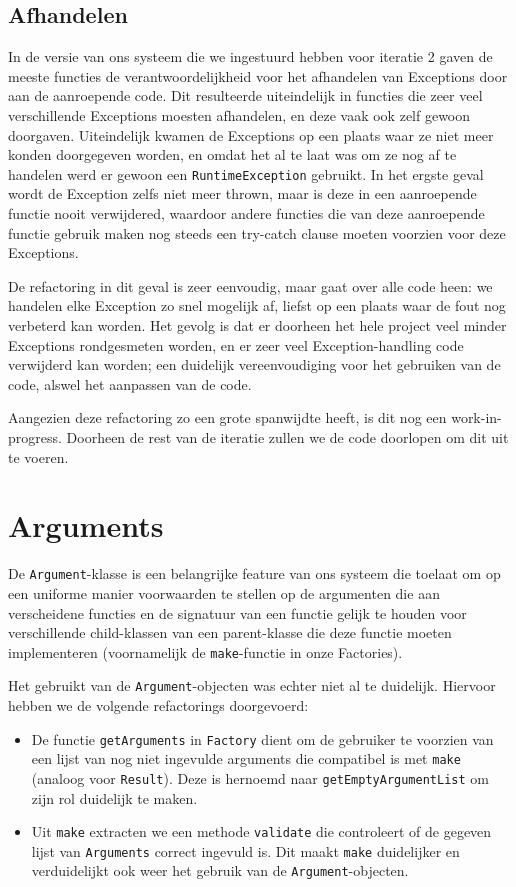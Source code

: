 \documentclass[a4paper]{article}
\begin{document}
\subsection{Afhandelen}
In de versie van ons systeem die we ingestuurd hebben voor iteratie 2 gaven de meeste functies de verantwoordelijkheid voor het afhandelen van Exceptions door aan de aanroepende code. Dit resulteerde uiteindelijk in functies die zeer veel verschillende Exceptions moesten afhandelen, en deze vaak ook zelf gewoon doorgaven. Uiteindelijk kwamen de Exceptions op een plaats waar ze niet meer konden doorgegeven worden, en omdat het al te laat was om ze nog af te handelen werd er gewoon een \texttt{RuntimeException} gebruikt. In het ergste geval wordt de Exception zelfs niet meer thrown, maar is deze in een aanroepende functie nooit verwijdered, waardoor andere functies die van deze aanroepende functie gebruik maken nog steeds een try-catch clause moeten voorzien voor deze Exceptions.

De refactoring in dit geval is zeer eenvoudig, maar gaat over alle code heen: we handelen elke Exception zo snel mogelijk af, liefst op een plaats waar de fout nog verbeterd kan worden. Het gevolg is dat er doorheen het hele project veel minder Exceptions rondgesmeten worden, en er zeer veel Exception-handling code verwijderd kan worden; een duidelijk vereenvoudiging voor het gebruiken van de code, alswel het aanpassen van de code.

Aangezien deze refactoring zo een grote spanwijdte heeft, is dit nog een work-in-progress. Doorheen de rest van de iteratie zullen we de code doorlopen om dit uit te voeren.

\section{Arguments}
De \texttt{Argument}-klasse is een belangrijke feature van ons systeem die toelaat om op een uniforme manier voorwaarden te stellen op de argumenten die aan verscheidene functies en de signatuur van een functie gelijk te houden voor verschillende child-klassen van een parent-klasse die deze functie moeten implementeren (voornamelijk de \texttt{make}-functie in onze Factories).

Het gebruikt van de \texttt{Argument}-objecten was echter niet al te duidelijk. Hiervoor hebben we de volgende refactorings doorgevoerd:
\begin{itemize}
\item De functie \texttt{getArguments} in \texttt{Factory} dient om de gebruiker te voorzien van een lijst van nog niet ingevulde arguments die compatibel is met \texttt{make} (analoog voor \texttt{Result}). Deze is hernoemd naar \texttt{getEmptyArgumentList} om zijn rol duidelijk te maken.
\item Uit \texttt{make} extracten we een methode \texttt{validate} die controleert of de gegeven lijst van \texttt{Arguments} correct ingevuld is. Dit maakt \texttt{make} duidelijker en verduidelijkt ook weer het gebruik van de \texttt{Argument}-objecten.
\end{itemize}
\end{document}
